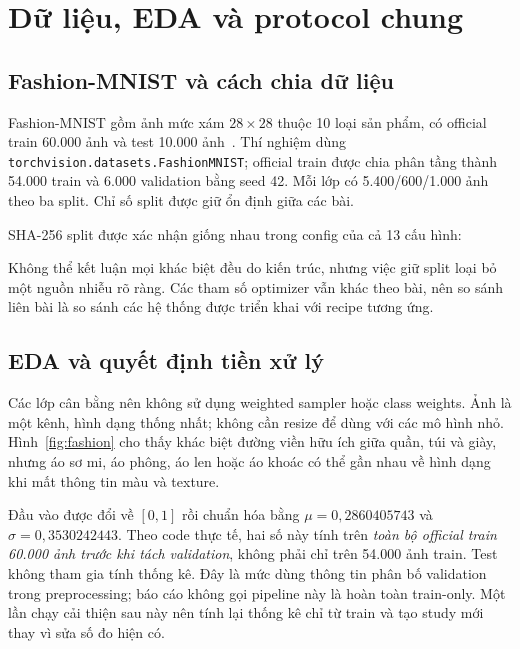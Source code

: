 \documentclass[11pt,a4paper]{article}
\begin{document}
\section{Dữ liệu, EDA và protocol chung}\label{sec:data}
\subsection{Fashion-MNIST và cách chia dữ liệu}
Fashion-MNIST gồm ảnh mức xám $28\times 28$ thuộc 10 loại sản phẩm, có official train 60.000 ảnh và test 10.000 ảnh~\cite{fashion,fashionrepo}. Thí nghiệm dùng \texttt{torchvision.datasets.FashionMNIST}; official train được chia phân tầng thành 54.000 train và 6.000 validation bằng seed 42. Mỗi lớp có 5.400/600/1.000 ảnh theo ba split. Chỉ số split được giữ ổn định giữa các bài.

SHA-256 split được xác nhận giống nhau trong config của cả 13 cấu hình:
\begin{quote}\footnotesize{}\end{quote}
Không thể kết luận mọi khác biệt đều do kiến trúc, nhưng việc giữ split loại bỏ một nguồn nhiễu rõ ràng. Các tham số optimizer vẫn khác theo bài, nên so sánh liên bài là so sánh các hệ thống được triển khai với recipe tương ứng.

\subsection{EDA và quyết định tiền xử lý}
Các lớp cân bằng nên không sử dụng weighted sampler hoặc class weights. Ảnh là một kênh, hình dạng thống nhất; không cần resize để dùng với các mô hình nhỏ. Hình~\ref{fig:fashion} cho thấy khác biệt đường viền hữu ích giữa quần, túi và giày, nhưng áo sơ mi, áo phông, áo len hoặc áo khoác có thể gần nhau về hình dạng khi mất thông tin màu và texture.

Đầu vào được đổi về $[0,1]$ rồi chuẩn hóa bằng $\mu=0{,}2860405743$ và $\sigma=0{,}3530242443$. Theo code thực tế, hai số này tính trên \emph{toàn bộ official train 60.000 ảnh trước khi tách validation}, không phải chỉ trên 54.000 ảnh train. Test không tham gia tính thống kê. Đây là mức dùng thông tin phân bố validation trong preprocessing; báo cáo không gọi pipeline này là hoàn toàn train-only. Một lần chạy cải thiện sau này nên tính lại thống kê chỉ từ train và tạo study mới thay vì sửa số đo hiện có.

\clearpage
\end{document}

